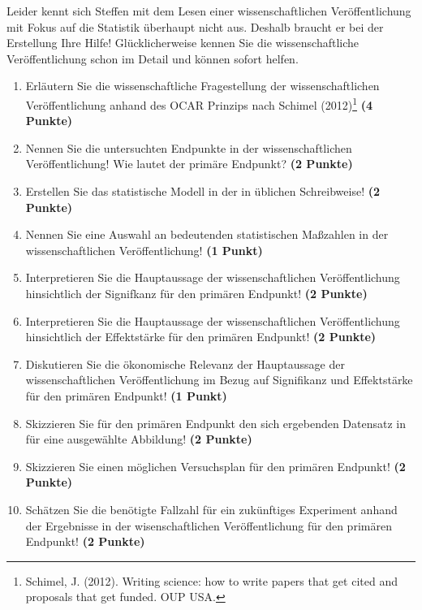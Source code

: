 \documentclass[a4paper, 9pt]{scrartcl}\usepackage[]{graphicx}\usepackage[]{xcolor}
\begin{document}
Leider kennt sich Steffen mit dem Lesen einer wissenschaftlichen Veröffentlichung mit Fokus auf die Statistik überhaupt nicht aus. Deshalb braucht er bei der Erstellung Ihre Hilfe! Glücklicherweise kennen Sie die wissenschaftliche Veröffentlichung schon im Detail und können sofort helfen.

\begin{enumerate}
  \setcounter{enumi}{0}
  \item Erläutern Sie die wissenschaftliche Fragestellung der wissenschaftlichen Veröffentlichung anhand des OCAR Prinzips nach Schimel (2012)\footnote{Schimel, J. (2012). Writing science: how to write papers that get cited and proposals that get funded. OUP USA.} \textbf{(4 Punkte)}
  \item Nennen Sie die untersuchten Endpunkte in der wissenschaftlichen Veröffentlichung! Wie lautet der primäre Endpunkt? \textbf{(2 Punkte)} 
\item Erstellen Sie das statistische Modell in der in \Rlogo üblichen Schreibweise! \textbf{(2 Punkte)}
  \item Nennen Sie eine Auswahl an bedeutenden statistischen Maßzahlen in der wissenschaftlichen Veröffentlichung! \textbf{(1 Punkt)}
  \item Interpretieren Sie die Hauptaussage der wissenschaftlichen Veröffentlichung hinsichtlich der Signifkanz für den primären Endpunkt! \textbf{(2 Punkte)}
  \item Interpretieren Sie die Hauptaussage der wissenschaftlichen Veröffentlichung hinsichtlich der Effektstärke für den primären Endpunkt! \textbf{(2 Punkte)}
  \item Diskutieren Sie die ökonomische Relevanz der Hauptaussage der wissenschaftlichen Veröffentlichung im Bezug auf Signifikanz und Effektstärke für den primären Endpunkt! \textbf{(1 Punkt)}
  \item Skizzieren Sie für den primären Endpunkt den sich ergebenden Datensatz in \Rlogo für eine ausgewählte Abbildung! \textbf{(2 Punkte)}
\item Skizzieren Sie einen möglichen Versuchsplan für den primären Endpunkt! \textbf{(2 Punkte)}
  \item Schätzen Sie die benötigte Fallzahl für ein zukünftiges Experiment anhand der Ergebnisse in der wisenschaftlichen Veröffentlichung für den primären Endpunkt! \textbf{(2 Punkte)}
\end{enumerate} 
\clearpage
\end{document}
